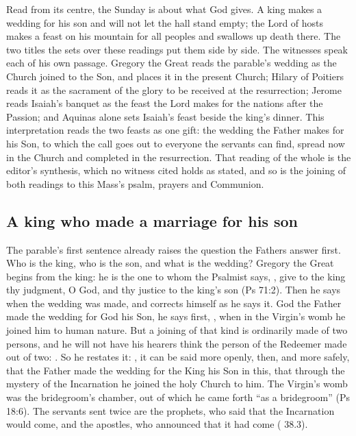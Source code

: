 \label{sec:the-kings-feast}

Read from its centre, the Sunday is about what God gives. A king makes a
wedding for his son and will not let the hall stand empty; the Lord of hosts
makes a feast on his mountain for all peoples and swallows up death there. The
two titles the  sets over these readings put them side by side. The
witnesses speak each of his own passage. Gregory the Great reads the parable's
wedding as the Church joined to the Son, and places it in the present Church;
Hilary of Poitiers reads it as the sacrament of the glory to be received at
the resurrection; Jerome reads Isaiah's banquet as the feast the Lord makes
for the nations after the Passion; and Aquinas alone sets Isaiah's feast
beside the king's dinner. This interpretation reads the two feasts as one
gift: the wedding the Father makes for his Son, to which the call goes out to
everyone the servants can find, spread now in the Church and completed in the
resurrection. That reading of the whole is the editor's synthesis, which no
witness cited holds as stated, and so is the joining of both readings to this
Mass's psalm, prayers and Communion.

\subsection{A king who made a marriage for his son}

The parable's first sentence already raises the question the Fathers answer
first. Who is the king, who is the son, and what is the wedding? Gregory the
Great begins from the king: he is the one to whom the Psalmist says,
, give to the
king thy judgment, O God, and thy justice to the king's son (Ps 71:2). Then he
says when the wedding was made, and corrects himself as he says it. God the
Father made the wedding for God his Son, he says first, , when in the Virgin's womb he joined
him to human nature. But a joining of that kind is ordinarily made of two
persons, and he will not have his hearers think the person of the Redeemer
made out of two: . So he restates
it: , it can be said more openly, then, and more safely, that the Father
made the wedding for the King his Son in this, that through the mystery of the
Incarnation he joined the holy Church to him. The Virgin's womb was the
bridegroom's chamber, out of which he came forth ``as a bridegroom'' (Ps 18:6).
The servants sent twice are the prophets, who said that the Incarnation would
come, and the apostles, who announced that it had come ( 38.3).

